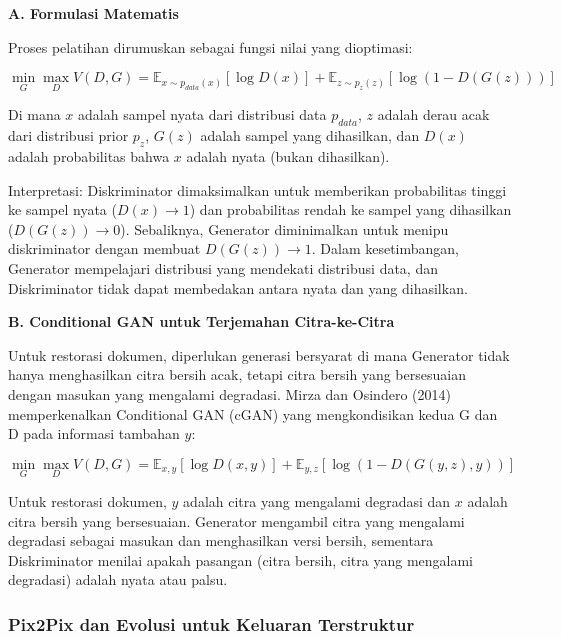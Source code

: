 \documentclass[12pt,a4paper]{book}
\begin{document}
\vspace{0.5ex}
\noindent\textbf{A. Formulasi Matematis}

Proses pelatihan dirumuskan sebagai fungsi nilai yang dioptimasi:

\begin{equation}
\min_G \max_D V(D, G) = \mathbb{E}_{x \sim p_{data}(x)}[\log D(x)] + \mathbb{E}_{z \sim p_z(z)}[\log(1 - D(G(z)))]
\end{equation}

Di mana $x$ adalah sampel nyata dari distribusi data $p_{data}$, $z$ adalah derau acak dari distribusi prior $p_z$, $G(z)$ adalah sampel yang dihasilkan, dan $D(x)$ adalah probabilitas bahwa $x$ adalah nyata (bukan dihasilkan).

Interpretasi: Diskriminator dimaksimalkan untuk memberikan probabilitas tinggi ke sampel nyata ($D(x) \to 1$) dan probabilitas rendah ke sampel yang dihasilkan ($D(G(z)) \to 0$). Sebaliknya, Generator diminimalkan untuk menipu diskriminator dengan membuat $D(G(z)) \to 1$. Dalam kesetimbangan, Generator mempelajari distribusi yang mendekati distribusi data, dan Diskriminator tidak dapat membedakan antara nyata dan yang dihasilkan.

\vspace{0.5ex}
\noindent\textbf{B. Conditional GAN untuk Terjemahan Citra-ke-Citra}

Untuk restorasi dokumen, diperlukan generasi bersyarat di mana Generator tidak hanya menghasilkan citra bersih acak, tetapi citra bersih yang bersesuaian dengan masukan yang mengalami degradasi. Mirza dan Osindero (2014) memperkenalkan Conditional GAN (cGAN) yang mengkondisikan kedua G dan D pada informasi tambahan $y$:

\begin{equation}
\min_G \max_D V(D, G) = \mathbb{E}_{x, y}[\log D(x, y)] + \mathbb{E}_{y, z}[\log(1 - D(G(y, z), y))]
\end{equation}

Untuk restorasi dokumen, $y$ adalah citra yang mengalami degradasi dan $x$ adalah citra bersih yang bersesuaian. Generator mengambil citra yang mengalami degradasi sebagai masukan dan menghasilkan versi bersih, sementara Diskriminator menilai apakah pasangan (citra bersih, citra yang mengalami degradasi) adalah nyata atau palsu.

\subsubsection{Pix2Pix dan Evolusi untuk Keluaran Terstruktur}
\label{subsubsec:pix2pix-evolution}
\end{document}
